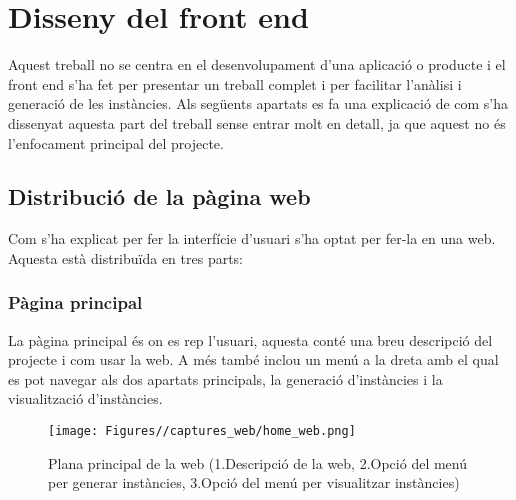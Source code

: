 


\chapter{Disseny del front end} %

\label{Disseny del front end} %

Aquest treball no se centra en el desenvolupament d'una aplicació o producte i el front end s'ha fet per presentar un treball complet i per facilitar l'anàlisi i generació de les instàncies. Als següents apartats es fa una explicació de com s'ha dissenyat aquesta part del treball sense entrar molt en detall, ja que aquest no és l'enfocament principal del projecte.

\section{Distribució de la pàgina web}
Com s'ha explicat per fer la interfície d'usuari s'ha optat per fer-la en una web. Aquesta està distribuïda en tres parts:
\subsection{Pàgina principal}
La pàgina principal és on es rep l'usuari, aquesta conté una breu descripció del projecte i com usar la web. A més també inclou un menú a la dreta amb el qual es pot navegar als dos apartats principals, la generació d'instàncies i la visualització d'instàncies.\\

\begin{figure}[H]
    \centering
    \texttt{[image: Figures//captures\_web/home\_web.png]}
    \caption{Plana principal de la web (1.Descripció de la web, 2.Opció del menú per generar instàncies, 3.Opció del menú per visualitzar instàncies)}
    \label{fig:home-webpage}
\end{figure}

